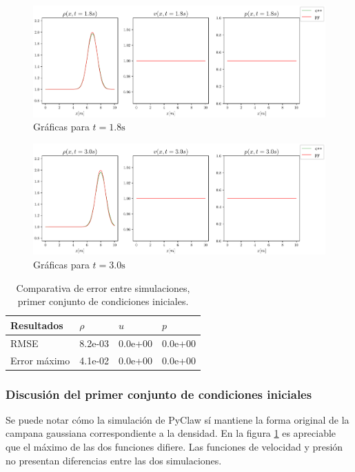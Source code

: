 \begin{figure}[ht]
	\centering
	\includegraphics[width=1.1\linewidth]{../euler1D/plots_en_TDG/py_sin_claw/py_gauss199/4.pdf}
	\caption{Gráficas para $t=1.8\unit{\s}$}
\end{figure}

\begin{figure}[ht]
\centering
\includegraphics[width=1.1\linewidth]{../euler1D/plots_en_TDG/py_sin_claw/py_gauss199/6.pdf}
\caption{Gráficas para $t=3.0\unit{\s}$}
\label{fig:set-1-py-seg3}
\end{figure}

\begin{table}[ht]
	\large
	\centering
	\begin{tabular}{|l|l|l|l|}
		\hline
		Resultados & $\rho$ & $u$ & $p$ \\ \hline
		RMSE & 8.2e-03 & 0.0e+00 & 0.0e+00 \\ \hline
		Error máximo & 4.1e-02 & 0.0e+00 & 0.0e+00 \\ \hline
	\end{tabular}
	\caption{Comparativa de error entre simulaciones, primer conjunto de condiciones iniciales.}
	\label{tab:tabla-set-1}
\end{table}

\subsubsection{Discusión del primer conjunto de condiciones iniciales}
Se puede notar cómo la simulación de PyClaw sí mantiene la forma original de la campana gaussiana correspondiente a la densidad. En la figura \ref{fig:set-1-py-seg3} es apreciable que el máximo de las dos funciones difiere. Las funciones de velocidad y presión no presentan diferencias entre las dos simulaciones.


